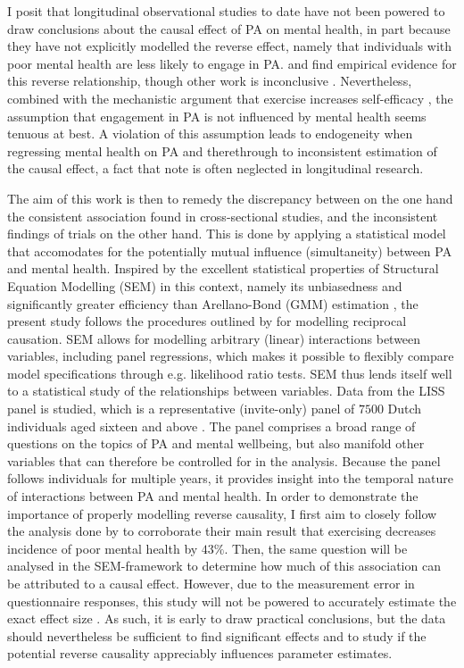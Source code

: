 \documentclass[a4paper,11pt]{report}
\begin{document}
I posit that longitudinal observational studies to date have not been powered to draw conclusions about the causal effect
of PA on mental health, in part because they have not explicitly modelled the reverse effect, namely that individuals with poor
mental health are less likely to engage in PA.
 and  find empirical evidence for this reverse relationship,
though other work is inconclusive \cite{birkeland2009longitudinal, ku2012physical}. Nevertheless, combined with the
mechanistic argument that exercise increases self-efficacy \cite{smith2021role}, the assumption that engagement in PA is
not influenced by mental health seems tenuous at best.
A violation of this assumption leads to endogeneity when regressing mental health on PA and therethrough to
inconsistent estimation of the causal effect, a fact that  note is often neglected in
longitudinal research.

The aim of this work is then to remedy the discrepancy between on the one hand the consistent association found in
cross-sectional studies, and the inconsistent findings of trials on the other hand.
This is done by applying a statistical model that accomodates for the potentially mutual influence (simultaneity)
between PA and mental health. Inspired by the excellent statistical properties of Structural Equation Modelling (SEM)
in this context, namely its unbiasedness and significantly greater efficiency than Arellano-Bond (GMM) estimation
\cite{leszczensky2022deal}, the present study follows the procedures outlined by 
for modelling reciprocal causation.
SEM allows for modelling arbitrary (linear) interactions between variables, including panel regressions,
which makes it possible to flexibly compare model specifications through e.g. likelihood ratio tests.
SEM thus lends itself well to a statistical study of the relationships between variables.
Data from the LISS panel is studied, which is a representative (invite-only) panel of $7500$ Dutch individuals aged
sixteen and above \cite{scherpenzeel2010liss}. The panel comprises a broad range of questions on the topics of PA and
mental wellbeing, but also manifold other variables that can therefore be controlled for in the analysis.
Because the panel follows individuals for multiple years, it provides insight into the temporal nature of interactions
between PA and mental health.
In order to demonstrate the importance of properly modelling reverse causality, I first aim to closely follow
the analysis done by  to corroborate their main result that exercising decreases incidence
of poor mental health by $43\%$.
Then, the same question will be analysed in the SEM-framework to determine how much of this association can be attributed
to a causal effect. However, due to the measurement error in questionnaire responses, this study will not be powered
to accurately estimate the exact effect size \cite{pereira2014depressive}. As such, it is early to draw practical conclusions, but the data should nevertheless
be sufficient to find significant effects and to study if the potential reverse causality appreciably influences
parameter estimates.
\end{document}
